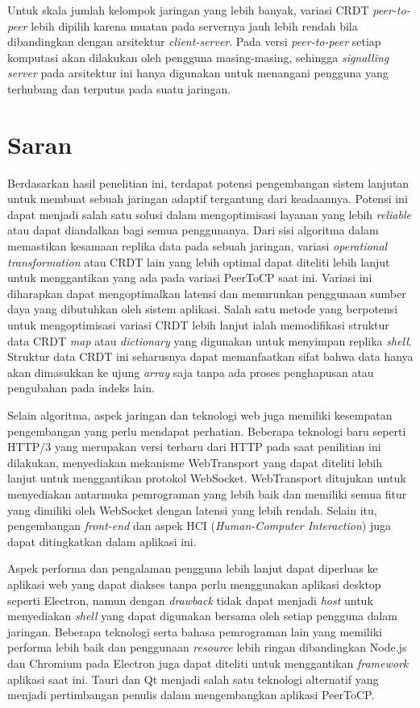 Untuk skala jumlah kelompok jaringan yang lebih banyak, variasi CRDT \textit{peer-to-peer} lebih dipilih karena muatan pada servernya jauh lebih rendah bila dibandingkan dengan arsitektur \textit{client-server}. Pada versi \textit{peer-to-peer} setiap komputasi akan dilakukan oleh pengguna masing-masing, sehingga \textit{signalling server} pada arsitektur ini hanya digunakan untuk menangani pengguna yang terhubung dan terputus pada suatu jaringan.

\section{Saran}
\label{sec:saran}

Berdasarkan hasil penelitian ini, terdapat potensi pengembangan sistem lanjutan untuk membuat sebuah jaringan adaptif tergantung dari keadaannya. Potensi ini dapat menjadi salah satu solusi dalam mengoptimisasi layanan yang lebih \textit{reliable} atau dapat diandalkan bagi semua penggunanya. Dari sisi algoritma dalam memastikan kesamaan replika data pada sebuah jaringan, variasi \textit{operational transformation} atau CRDT lain yang lebih optimal dapat diteliti lebih lanjut untuk menggantikan yang ada pada variasi PeerToCP saat ini. Variasi ini diharapkan dapat mengoptimalkan latensi dan menurunkan penggunaan sumber daya yang dibutuhkan oleh sistem aplikasi. Salah satu metode yang berpotensi untuk mengoptimisasi variasi CRDT lebih lanjut ialah memodifikasi struktur data CRDT \textit{map} atau \textit{dictionary} yang digunakan untuk menyimpan replika \textit{shell}. Struktur data CRDT ini seharusnya dapat memanfaatkan sifat bahwa data hanya akan dimasukkan ke ujung \textit{array} saja tanpa ada proses penghapusan atau pengubahan pada indeks lain.

Selain algoritma, aspek jaringan dan teknologi web juga memiliki kesempatan pengembangan yang perlu mendapat perhatian. Beberapa teknologi baru seperti HTTP/3 yang merupakan versi terbaru dari HTTP pada saat penilitian ini dilakukan, menyediakan mekanisme WebTransport yang dapat diteliti lebih lanjut untuk menggantikan protokol WebSocket. WebTransport ditujukan untuk menyediakan antarmuka pemrograman yang lebih baik dan memiliki semua fitur yang dimiliki oleh WebSocket dengan latensi yang lebih rendah. Selain itu, pengembangan \textit{front-end} dan aspek HCI (\textit{Human-Computer Interaction}) juga dapat ditingkatkan dalam aplikasi ini.

Aspek performa dan pengalaman pengguna lebih lanjut dapat diperluas ke aplikasi web yang dapat diakses tanpa perlu menggunakan aplikasi desktop seperti Electron, namun dengan \textit{drawback} tidak dapat menjadi \textit{host} untuk menyediakan \textit{shell} yang dapat digunakan bersama oleh setiap pengguna dalam jaringan. Beberapa teknologi serta bahasa pemrograman lain yang memiliki performa lebih baik dan penggunaan \textit{resource} lebih ringan dibandingkan Node.js dan Chromium pada Electron juga dapat diteliti untuk menggantikan \textit{framework} aplikasi saat ini. Tauri dan Qt menjadi salah satu teknologi alternatif yang menjadi pertimbangan penulis dalam mengembangkan aplikasi PeerToCP.
